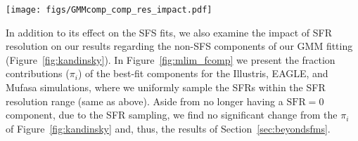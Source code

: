 \documentclass[tighten, preprint]{aastex62}
\begin{document}
\begin{figure*}
\begin{center}
\texttt{[image: figs/GMMcomp\_comp\_res\_impact.pdf]}
\caption{Fractional contributions, $\pi_i$, of the best-fit GMM components 
from our method for the hydrodynamic simulations (Illustris, EAGLE, and 
{\sc Mufasa}) where we uniformly sample the $100\,\mathrm{Myr}$ SFRs within
the SFR resolution range --- $\mathrm{SFR}_i^{\prime} \in [\mathrm{SFR}_i, \mathrm{SFR}_i + 
\Delta_\mathrm{SFR}]$. Compared to Figure~\ref{fig:kandinsky}, we find SFR 
resolution has no significant impact on the qualitative results in Section~\ref{sec:beyondsfms}.} 
\label{fig:mlim_fcomp}
\end{center}
\end{figure*}

In addition to its effect on the SFS fits, we also examine the impact of 
SFR resolution on our results regarding the non-SFS components of our GMM 
fitting (Figure~\ref{fig:kandinsky}). In 
Figure~\ref{fig:mlim_fcomp} we present the fraction contributions ($\pi_i$) 
of the best-fit components for the Illustris, EAGLE, and {\sc Mufasa} 
simulations, where we uniformly sample the SFRs within the SFR resolution range (same as above). Aside from 
no longer having a $\mathrm{SFR}{=}0$ component, due to the SFR sampling, we 
find no significant change from the $\pi_i$ of Figure~\ref{fig:kandinsky} and, 
thus, the results of Section~\ref{sec:beyondsfms}. 



\end{document}
